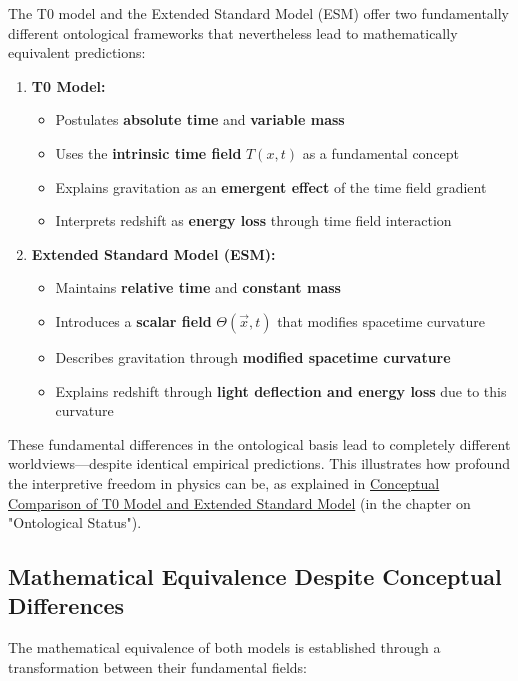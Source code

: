 \documentclass[12pt,a4paper]{article}
\newcommand{\Tfieldt}{T(x,t)}
\newcommand{\vecx}{\vec{x}}
\begin{document}
	The T0 model and the Extended Standard Model (ESM) offer two fundamentally different ontological frameworks that nevertheless lead to mathematically equivalent predictions:
	
	\begin{enumerate}
		\item \textbf{T0 Model:}
		\begin{itemize}
			\item Postulates \textbf{absolute time} and \textbf{variable mass}
			\item Uses the \textbf{intrinsic time field} $\Tfieldt$ as a fundamental concept
			\item Explains gravitation as an \textbf{emergent effect} of the time field gradient
			\item Interprets redshift as \textbf{energy loss} through time field interaction
		\end{itemize}
		
		\item \textbf{Extended Standard Model (ESM):}
		\begin{itemize}
			\item Maintains \textbf{relative time} and \textbf{constant mass}
			\item Introduces a \textbf{scalar field} $\Theta(\vecx,t)$ that modifies spacetime curvature
			\item Describes gravitation through \textbf{modified spacetime curvature}
			\item Explains redshift through \textbf{light deflection and energy loss} due to this curvature
		\end{itemize}
	\end{enumerate}
	
	These fundamental differences in the ontological basis lead to completely different worldviews—despite identical empirical predictions. This illustrates how profound the interpretive freedom in physics can be, as explained in \href{https://github.com/jpascher/T0-Time-Mass-Duality/tree/main/2/pdf/English/T0vsESM_ConceptualAnalysisEn.pdf}{Conceptual Comparison of T0 Model and Extended Standard Model} (in the chapter on "Ontological Status").
	
	\subsection{Mathematical Equivalence Despite Conceptual Differences}
	\label{subsec:mathematical_equivalence}
	
	The mathematical equivalence of both models is established through a transformation between their fundamental fields:
	
\end{document}
